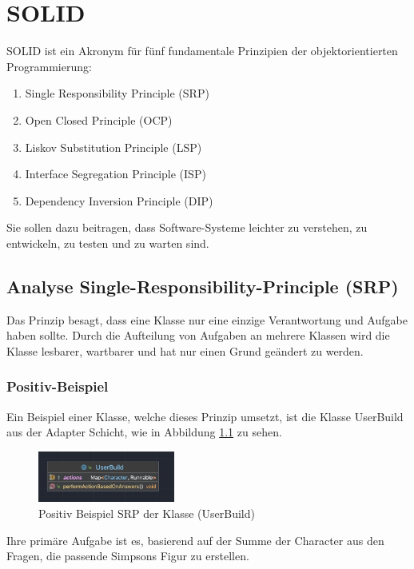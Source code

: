 \chapter{SOLID}
SOLID ist ein Akronym für fünf fundamentale Prinzipien der objektorientierten Programmierung:
\begin{enumerate}
    \item Single Responsibility Principle (SRP)
    \item Open Closed Principle (OCP)
    \item Liskov Substitution Principle (LSP)
    \item Interface Segregation Principle (ISP)
    \item Dependency Inversion Principle (DIP)
\end{enumerate}
Sie sollen dazu beitragen, dass Software-Systeme leichter zu verstehen, zu entwickeln, zu testen und zu warten sind. \cite{martin.2017}
\section{Analyse Single-Responsibility-Principle (SRP)}
Das Prinzip besagt, dass eine Klasse nur eine einzige Verantwortung und Aufgabe haben sollte. Durch die Aufteilung von Aufgaben an mehrere Klassen wird die Klasse lesbarer, wartbarer und hat nur einen Grund geändert zu werden. \cite{martin.2017}
\newpage
\subsection{Positiv-Beispiel}
Ein Beispiel einer Klasse, welche dieses Prinzip umsetzt, ist die Klasse UserBuild aus der Adapter Schicht, wie in Abbildung \ref{fig:UMLUserBuild} zu sehen.
\begin{figure}[ht]
    \centering
    \includegraphics[width=0.4\textwidth]{Bilder/UB.png}
    \caption{Positiv Beispiel SRP der Klasse (UserBuild)}
    \label{fig:UMLUserBuild}
\end{figure}
Ihre primäre Aufgabe ist es, basierend auf der Summe der Character aus den Fragen, die passende Simpsons Figur zu erstellen. 
